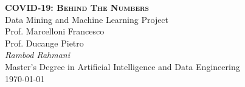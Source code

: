 \documentclass[11pt,a4paper]{article}
\begin{document}
\begin{center}
	\huge{\bfseries{\scshape{COVID-19: Behind The Numbers}}}\\
	\vspace{1.0cm}
	\large{Data Mining and Machine Learning Project}\\
	\vspace{0.2cm}
	\large{Prof. Marcelloni Francesco}\\
	\vspace{0.2cm}
	\large{Prof. Ducange Pietro}\\
	\vspace{1.0cm}
	\large\textit{Rambod Rahmani}\\
	\vspace{0.2cm}
	\scriptsize{Master's Degree in Artificial Intelligence and
	Data Engineering}\\
	\vspace{1.0cm}
	\normalsize{\today}
\end{center}

\tableofcontents
\newpage

\end{document}
